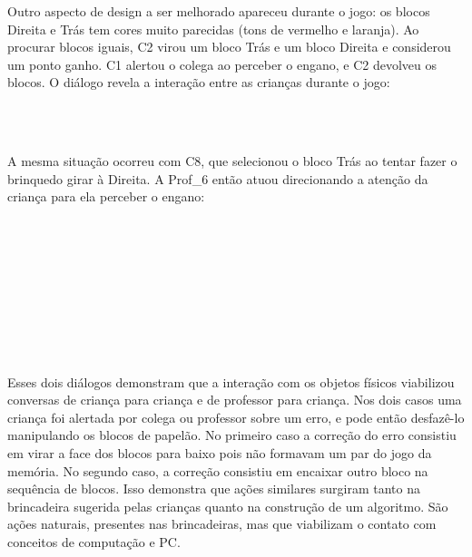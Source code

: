 Outro aspecto de design a ser melhorado apareceu durante o jogo: os blocos Direita e Trás tem cores muito parecidas (tons de vermelho e laranja). Ao procurar blocos iguais, C2 virou um bloco Trás e um bloco Direita e considerou um ponto ganho. C1 alertou o colega ao perceber o engano, e C2 devolveu os blocos. O diálogo revela a interação entre as crianças durante o jogo:

\begin{dialogo}
     \\
     \\ 
\end{dialogo}

A mesma situação ocorreu com C8, que selecionou o bloco Trás ao tentar fazer o brinquedo girar à Direita. A Prof\_6 então atuou direcionando a atenção da criança para ela perceber o engano:

\begin{dialogo}
     \\
     \\
     \\
      \\
     \\
      \\
     \\
      \\
\end{dialogo}

Esses dois diálogos demonstram que a interação com os objetos físicos viabilizou conversas de criança para criança e de professor para criança. Nos dois casos uma criança foi alertada por colega ou professor sobre um erro, e pode então desfazê-lo manipulando os blocos de papelão. No primeiro caso a correção do erro consistiu em virar a face dos blocos para baixo pois não formavam um par do jogo da memória. No segundo caso, a correção consistiu em encaixar outro bloco na sequência de blocos. Isso demonstra que ações similares surgiram tanto na brincadeira sugerida pelas crianças quanto na construção de um algoritmo. São ações naturais, presentes nas brincadeiras, mas que viabilizam o contato com conceitos de computação e \ac{PC}.


